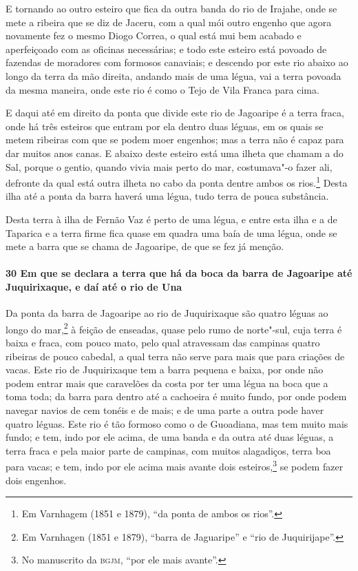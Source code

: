 \begin{linenumbers}
E tornando ao outro esteiro que fica da outra banda do rio de Irajahe, onde se mete a
ribeira que se diz de Jaceru, com a qual mói outro engenho que agora novamente fez o mesmo
Diogo Correa, o qual está mui bem acabado e aperfeiçoado com as oficinas necessárias; e
todo este esteiro está povoado de fazendas de moradores com formosos canaviais; e descendo
por este rio abaixo ao longo da terra da mão direita, andando mais de uma légua, vai a
terra povoada da mesma maneira, onde este rio é como o Tejo de Vila Franca para cima.

E daqui até em direito da ponta que divide este rio de Jagoaripe é a terra fraca, onde há
três esteiros que entram por ela dentro duas léguas, em os quais se metem ribeiras com que
se podem moer engenhos; mas a terra não é capaz para dar muitos anos canas. E abaixo deste
esteiro está uma ilheta que chamam a do Sal, porque o gentio, quando vivia mais perto do
mar, costumava"-o fazer ali, defronte da qual está outra ilheta no cabo da ponta dentre
ambos os rios.\footnote{ Em Varnhagem (1851 e 1879), ``da ponta de ambos os rios''.}
Desta ilha até a ponta da barra haverá uma légua, tudo terra de pouca substância.

Desta terra à ilha de Fernão Vaz é perto de uma légua, e entre esta ilha e a de Taparica e
a terra firme fica quase em quadra uma baía de uma légua, onde se mete a barra que se
chama de Jagoaripe, de que se fez já menção.

\paragraph{30 Em que se declara a terra que há da boca da barra de Jagoaripe até
Juquirixaque, e daí até o rio de Una}\quad
Da ponta da barra de Jagoaripe ao rio de Juquirixaque são quatro léguas ao longo do
mar,\footnote{ Em Varnhagen (1851 e 1879), ``barra de Jaguaripe'' e ``rio de
Juquirijape''.} à feição de enseadas, quase pelo rumo de norte"-sul, cuja terra é baixa e
fraca, com pouco mato, pelo qual atravessam das campinas quatro ribeiras de pouco cabedal,
a qual terra não serve para mais que para criações de vacas. Este rio de Juquirixaque tem
a barra pequena e baixa, por onde não podem entrar mais que caravelões da costa por ter
uma légua na boca que a toma toda; da barra para dentro até a cachoeira é muito fundo, por
onde podem navegar navios de cem tonéis e de mais; e de uma parte a outra pode haver
quatro léguas. Este rio é tão formoso como o de Guoadiana, mas tem muito mais fundo; e
tem, indo por ele acima, de uma banda e da outra até duas léguas, a terra fraca e pela
maior parte de campinas, com muitos alagadiços, terra boa para vacas; e tem, indo por ele
acima mais avante dois esteiros,\footnote{ No manuscrito da \textsc{bgjm}, ``por ele mais
avante''.} se podem fazer dois engenhos.


\end{linenumbers}
